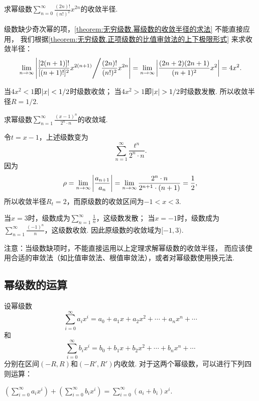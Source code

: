 \begin{example}
求幂级数\(\sum\limits_{n=0}^\infty \frac{(2n)!}{(n!)^2} x^{2n}\)的收敛半径.
\begin{solution}
级数缺少奇次幂的项，\cref{theorem:无穷级数.幂级数的收敛半径的求法} 不能直接应用，
我们根据\cref{theorem:无穷级数.正项级数的比值审敛法的上下极限形式} 来求收敛半径：
\[
\lim\limits_{n\to\infty} \abs{{\frac{[2(n+1)]!}{[(n+1)!]^2} x^{2(n+1)}}\Bigg/{\frac{(2n)!}{(n!)^2} x^{2n}}}
= \lim\limits_{n\to\infty} \abs{\frac{(2n+2)(2n+1)}{(n+1)^2} x^2}
= 4 x^2.
\]

当\(4 x^2 < 1\)即\(\abs{x} < 1/2\)时级数收敛；
当\(4 x^2 > 1\)即\(\abs{x} > 1/2\)时级数发散.
所以收敛半径\(R = 1/2\).
\end{solution}
\end{example}

\begin{example}
求幂级数\(\sum\limits_{n=1}^\infty \frac{(x-1)^n}{2^n \cdot n}\)的收敛域.
\begin{solution}
令\(t = x-1\)，上述级数变为\[
\sum\limits_{n=1}^\infty \frac{t^n}{2^n \cdot n}.
\]因为\[
\rho = \lim\limits_{n\to\infty} \abs{\frac{a_{n+1}}{a_n}} = \lim\limits_{n\to\infty} \frac{2^n \cdot n}{2^{n+1} \cdot (n+1)} = \frac{1}{2},
\]所以收敛半径\(R_t = 2\)，而原级数的收敛区间为\(-1<x<3\).

当\(x=3\)时，级数成为\(\sum\limits_{n=1}^\infty \frac{1}{n}\)，这级数发散；
当\(x=-1\)时，级数成为\(\sum\limits_{n=1}^\infty \frac{(-1)^n}{n}\)，这级数收敛.
因此原级数的收敛域为\([-1,3)\).
\end{solution}
\end{example}

注意：当级数缺项时，不能直接运用以上定理求解幂级数的收敛半径，
而应该使用合适的审敛法（如比值审敛法、根值审敛法），或者对幂级数使用换元法.

\subsection{幂级数的运算}
设幂级数\[
\sum\limits_{i=0}^\infty a_i x^i
= a_0 + a_1 x + a_2 x^2 + \dotsb + a_n x^n + \dotsb
\]和\[
\sum\limits_{i=0}^\infty b_i x^i
= b_0 + b_1 x + b_2 x^2 + \dotsb + b_n x^n + \dotsb
\]分别在区间\((-R,R)\)和\((-R',R')\)内收敛.
对于这两个幂级数，可以进行下列四则运算：

\begin{definition}[幂级数的加法]
\(\left(\sum\limits_{i=0}^\infty a_i x^i\right)
+ \left(\sum\limits_{i=0}^\infty b_i x^i\right)
= \sum\limits_{i=0}^\infty (a_i+b_i) x^i\).
\end{definition}

